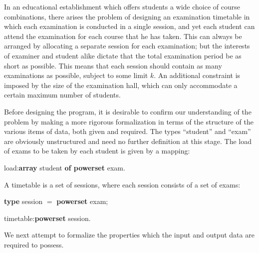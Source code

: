 In an educational establishment which offers students a wide choice of course combinations, there arises the problem of designing an examination timetable in which each examination is conducted in a single session, and yet each student can attend the examination for each course that he has taken. This can always be arranged by allocating a separate session for each examination; but the interests of examiner and student alike dictate that the total examination period be as short as possible. This means that each session should contain as many examinations as possible, subject to some limit $k$. An additional constraint is imposed by the size of the examination hall, which can only accommodate a certain maximum number of students.

Before designing the program, it is desirable to confirm our understanding of the problem by making a more rigorous formalization in terms of the structure of the various items of data, both given and required. The types ``student'' and ``exam'' are obviously unstructured and need no further definition at this stage. The load of exams to be taken by each student is given by a mapping:

\quad load:\textbf{array} student \textbf{of powerset} exam.

\noindent
A timetable is a set of sessions, where each session consists of a set of exams:

\quad \textbf{type} session $=$ \textbf{powerset} exam;

\quad timetable:\textbf{powerset} session.

\noindent
We next attempt to formalize the properties which the input and output data are required to possess.

